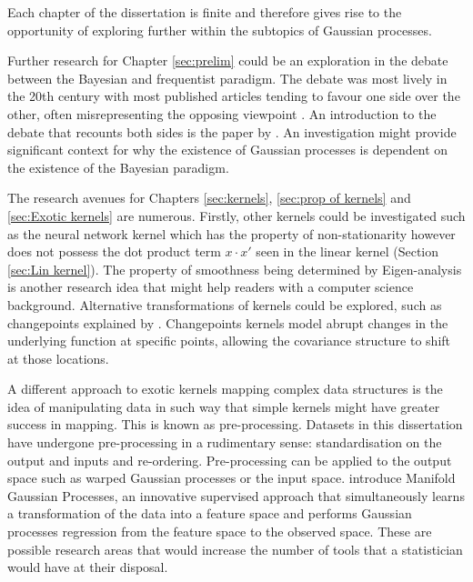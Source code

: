 \documentclass[12pt,a4paper]{article}
\begin{document}
Each chapter of the dissertation is finite and therefore gives rise to the opportunity of exploring further within the subtopics of Gaussian processes. 

Further research for Chapter \ref{sec:prelim} could be an exploration in the debate between the Bayesian and frequentist paradigm. The debate was most lively in the 20th century with most published articles tending to favour one side over the other, often misrepresenting the opposing viewpoint \citep{hoff2009first}. An introduction to the debate that recounts both sides is the paper by \citet{little2006calibrated}. An investigation might provide significant context for why the existence of Gaussian processes is dependent on the existence of the Bayesian paradigm.

The research avenues for Chapters \ref{sec:kernels}, \ref{sec:prop of kernels} and \ref{sec:Exotic kernels} are numerous. Firstly, other kernels could be investigated such as the neural network kernel \citep{radford1996bayesian} which has the property of non-stationarity however does not possess the dot product term \(x \cdot x'\) seen in the linear kernel (Section \ref{sec:Lin kernel}). The property of smoothness being determined by Eigen-analysis \citep[see~section 4.3]{williams2006gaussian} is another research idea that might help readers with a computer science background. Alternative transformations of kernels could be explored, such as changepoints explained by \citet{duvenaud2014automatic}. Changepoints kernels model abrupt changes in the underlying function at specific points, allowing the covariance structure to shift at those locations.  

A different approach to exotic kernels mapping complex data structures is the idea of manipulating data in such way that simple kernels might have greater success in mapping. This is known as pre-processing. Datasets in this dissertation have undergone pre-processing in a rudimentary sense: standardisation on the output and inputs and re-ordering. Pre-processing can be applied to the output space such as warped Gaussian processes \citep{snelson2003warped} or the input space. \citet{calandra2016manifold} introduce Manifold Gaussian Processes, an innovative supervised approach that simultaneously learns a transformation of the data into a feature space and performs Gaussian processes regression from the feature space to the observed space. These are possible research areas that would increase the number of tools that a statistician would have at their disposal.
\end{document}
